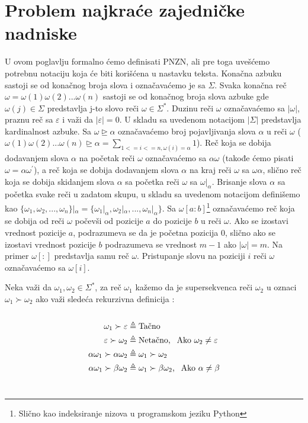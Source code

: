 \documentclass[12pt,oneside]{memoir}
\begin{document}
\section{Problem najkraće zajedničke nadniske}
U ovom poglavlju formalno ćemo definisati PNZN, ali pre toga uvešćemo potrebnu notaciju koja će biti korišćena u nastavku
teksta. Konačna azbuku sastoji se od konačnog broja slova i označavaćemo je sa $\Sigma$. Svaka konačna reč
$\omega=\omega(1)\omega(2)...\omega(n)$ sastoji se od konačnog broja slova azbuke gde $\omega(j)\in\Sigma$ predstavlja j-to slovo reči $\omega\in\Sigma^*$.
Duzinu reči $\omega$ označavaćemo sa $|\omega|$, praznu reč sa $\varepsilon$ i važi da $|\varepsilon|=0$. U skladu sa uvedenom
notacijom $|\Sigma|$ predstavlja kardinalnost azbuke. Sa $\omega\unrhd\alpha$ označavaćemo broj pojavljivanja slova $\alpha$
u reči $\omega$ ($\omega(1)\omega(2)...\omega(n)\unrhd\alpha=\sum_{1<=i<=n,\omega(i)=\alpha}1$). Reč koja se dobija dodavanjem
slova $\alpha$ na početak reči $\omega$ označavaćemo sa $\alpha\omega$ (takođe ćemo pisati $\omega=\alpha\omega^{'}$),
a reč koja se dobija dodavanjem slova $\alpha$ na kraj reči $\omega$ sa $\omega\alpha$, slično reč koja se dobija skidanjem slova $\alpha$ sa početka
reči $\omega$ sa $\omega|_{\alpha}$. Brisanje slova $\alpha$ sa početka svake reči u zadatom skupu, u skladu sa uvedenom notacijom
definišemo kao $\{\omega_{1},\omega_{2},...,\omega_{n}\}|_{\alpha}=\{\omega_{1}|_{\alpha},\omega_{2}|_{\alpha},...,\omega_{n}|_{\alpha}\}$.
Sa $\omega[a:b]$\footnote{Slično kao indeksiranje nizova u programskom jeziku Python} označavaćemo reč koja se dobija od
reči $\omega$ počevši od pozicije $a$ do pozicije $b$ u reči $\omega$. Ako se izostavi vrednost pozicije $a$, podrazumeva se
da je početna pozicija 0, slično ako se izostavi vrednost pozicije $b$ podrazumeva se vrednost $m-1$ ako $|\omega|=m$.
Na primer $\omega[:]$ predstavlja samu reč $\omega$. Pristupanje slovu na poziciji $i$ reči $\omega$ 
označavaćemo sa $\omega[i]$.

Neka važi da $\omega_{1},\omega_{2}\in\Sigma^*$, za reč $\omega_{1}$ kažemo da je
supersekvenca reči $\omega_{2}$ u oznaci $\omega_{1}\succ\omega_{2}$ ako važi sledeća rekurzivna definicija \cite{ProbabilisticBS}:
\\
\\
\begin{equation}
\begin{aligned}
\omega_{1}\succ\varepsilon &\triangleq \textrm{Tačno}\\
\varepsilon\succ\omega_{2} &\triangleq \textrm{Netačno, \:\:Ako } \omega_{2}\neq\varepsilon\\
\alpha\omega_{1}\succ\alpha\omega_{2} &\triangleq \omega_{1}\succ\omega_{2}\\
\alpha\omega_{1}\succ\beta\omega_{2} &\triangleq \omega_{1}\succ\beta\omega_{2} \textrm{, \:\:Ako } \alpha\neq\beta
\end{aligned}
\end{equation}
\\
\end{document}
